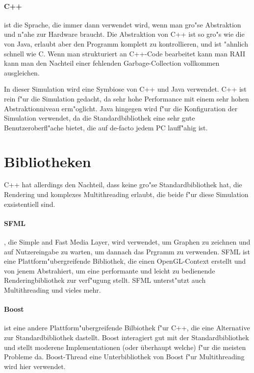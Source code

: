 \documentclass[14pt, a4paper]{report}
\begin{document}
\paragraph{C++} ist die Sprache, die immer dann verwendet wird, wenn man gro"se 
Abstraktion und n"ahe zur Hardware braucht. Die Abstraktion von C++ ist so gro"s wie die
von Java, erlaubt aber den Programm komplett zu kontrollieren, und ist "ahnlich schnell
wie C. Wenn man strukturiert an C++-Code bearbeitet kann man RAII  kann man den Nachteil einer fehlenden 
Garbage-Collection vollkommen ausgleichen.

In dieser Simulation wird eine Symbiose von C++ und Java verwendet. C++ ist rein f"ur 
die Simulation gedacht, da sehr hohe Performance mit einem sehr hohen Abstraktionniveau erm"oglicht. Java hingegen wird f"ur die Konfiguration der Simulation verwendet, da die
Standardbibliothek eine sehr gute Benutzeroberfl"ache bietet, die auf de-facto jedem
PC lauff"ahig ist.

\section{Bibliotheken}
C++ hat allerdings den Nachteil, dass keine gro"se Standardbibliothek hat, die Rendering
und komplexes Multithreading erlaubt, die beide f"ur diese Simulation exsistentiell 
sind. 

\paragraph{SFML}, die Simple and Fast Media Layer, wird verwendet, um Graphen zu 
zeichnen und auf Nutzereingabe zu warten, um dannach das Prgramm zu verwenden. SFML
ist eine Plattform"ubergreifende Bibliothek, die einen OpenGL-Context erstellt und von
jenem Abstrahiert, um eine performante und leicht zu bedienende Renderingbibliothek zur
verf"ugung stellt. SFML unterst"utzt auch Multithreading und vieles mehr.

\paragraph{Boost} ist eine andere Plattform"ubergreifende Bilbiothek f"ur C++, die eine
Alternative zur Standardbibliothek dastellt. Boost interagiert gut mit der 
Standardbibliothek und stellt moderene Implementationen (oder überhaupt welche) f"ur
die meisten Probleme da. Boost-Thread eine Unterbibliothek von Boost f"ur Multithreading
wird hier verwendet.
\end{document}
